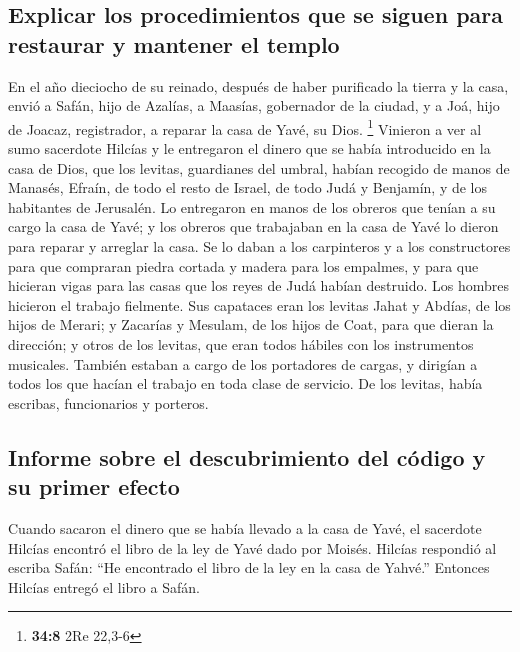 \hypertarget{explicar-los-procedimientos-que-se-siguen-para-restaurar-y-mantener-el-templo}{%
\subsection{Explicar los procedimientos que se siguen para restaurar y
mantener el
templo}\label{explicar-los-procedimientos-que-se-siguen-para-restaurar-y-mantener-el-templo}}

 En el año dieciocho de su reinado, después de haber
purificado la tierra y la casa, envió a Safán, hijo de Azalías, a
Maasías, gobernador de la ciudad, y a Joá, hijo de Joacaz, registrador,
a reparar la casa de Yavé, su Dios. \footnote{\textbf{34:8} 2Re 22,3-6}
 Vinieron a ver al sumo sacerdote Hilcías y le entregaron
el dinero que se había introducido en la casa de Dios, que los levitas,
guardianes del umbral, habían recogido de manos de Manasés, Efraín, de
todo el resto de Israel, de todo Judá y Benjamín, y de los habitantes de
Jerusalén.  Lo entregaron en manos de los obreros que
tenían a su cargo la casa de Yavé; y los obreros que trabajaban en la
casa de Yavé lo dieron para reparar y arreglar la casa. 
Se lo daban a los carpinteros y a los constructores para que compraran
piedra cortada y madera para los empalmes, y para que hicieran vigas
para las casas que los reyes de Judá habían destruido. 
Los hombres hicieron el trabajo fielmente. Sus capataces eran los
levitas Jahat y Abdías, de los hijos de Merari; y Zacarías y Mesulam, de
los hijos de Coat, para que dieran la dirección; y otros de los levitas,
que eran todos hábiles con los instrumentos musicales. 
También estaban a cargo de los portadores de cargas, y dirigían a todos
los que hacían el trabajo en toda clase de servicio. De los levitas,
había escribas, funcionarios y porteros.

\hypertarget{informe-sobre-el-descubrimiento-del-cuxf3digo-y-su-primer-efecto}{%
\subsection{Informe sobre el descubrimiento del código y su primer
efecto}\label{informe-sobre-el-descubrimiento-del-cuxf3digo-y-su-primer-efecto}}

 Cuando sacaron el dinero que se había llevado a la casa
de Yavé, el sacerdote Hilcías encontró el libro de la ley de Yavé dado
por Moisés.  Hilcías respondió al escriba Safán: ``He
encontrado el libro de la ley en la casa de Yahvé.'' Entonces Hilcías
entregó el libro a Safán.

